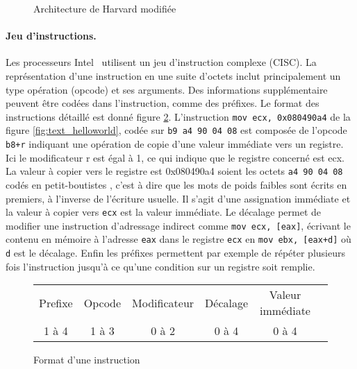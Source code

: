 \begin{figure}
\begin{center}

\caption{Architecture de Harvard modifiée}
\label{fig:arch_harvard_mod}
\end{center}
\end{figure}

\paragraph{Jeu d'instructions.}
Les processeurs Intel \xq\ utilisent un jeu d'instruction complexe (CISC). La représentation d'une instruction en une suite d'octets inclut principalement un type opération (opcode) et ses arguments. Des informations supplémentaire peuvent être codées dans l'instruction, comme des préfixes. Le format des instructions détaillé est donné figure \ref{fig:format_insts_x86}. 
L'instruction \texttt{mov ecx, 0x080490a4} de la figure \ref{fig:text_helloworld}, codée sur \texttt{b9 a4 90 04 08} est composée de l'opcode \texttt{b8+r} indiquant une opération de copie d'une valeur immédiate vers un registre. Ici le modificateur r est égal à 1, ce qui indique que le registre concerné est ecx. La valeur à copier vers le registre est 0x080490a4 soient les octets \texttt{a4 90 04 08} codés en petit-boutistes , c'est à dire que les mots de poids faibles sont écrits en premiers, à l'inverse de l'écriture usuelle.
Il s'agit d'une assignation immédiate et la valeur à copier vers \texttt{ecx} est la valeur immédiate.
Le décalage permet de modifier une instruction d'adressage indirect comme \texttt{mov ecx, [eax]}, écrivant le contenu en mémoire à l'adresse \texttt{eax} dans le registre \texttt{ecx} en \texttt{mov ebx, [eax+d]} où \texttt{d} est le décalage.
Enfin les préfixes permettent par exemple de répéter plusieurs fois l'instruction jusqu'à ce qu'une condition sur un registre soit remplie.

\begin{figure}
\begin{center} 
\begin{tabular}{|c|c|c|c|c|c|}
\hline
Prefixe & Opcode & Modificateur & Décalage & Valeur immédiate\\
1 à 4 & 1 à 3 & 0 à 2 & 0 à 4 & 0 à 4\\
\hline
\end{tabular}
\end{center} 
\caption{Format d'une instruction \xq}
\label{fig:format_insts_x86}
\end{figure}

